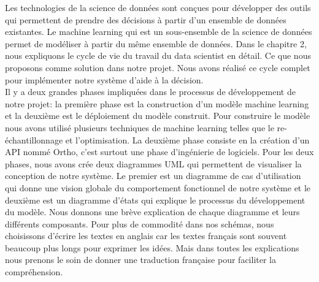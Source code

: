 \documentclass[12pt, french]{report}
\begin{document}
Les technologies de la science de données sont conçues pour développer des outils qui permettent de prendre des décisions à partir d'un ensemble de données existantes. Le machine learning qui est un sous-ensemble de la science de données permet de modéliser à partir du même ensemble de données. Dans le chapitre 2, nous expliquons le cycle de vie du travail du data scientist en détail. Ce que nous proposons comme solution dans notre projet. Nous avons réalisé ce cycle complet pour implémenter notre système d'aide à la décision. \\

Il y a deux grandes phases impliquées dans le processus de développement de notre projet: la première phase est la construction d'un modèle machine learning et la deuxième est le déploiement du modèle construit. Pour construire le modèle nous avons utilisé plusieurs techniques de machine learning telles que le re-échantillonnage et l'optimisation.  La deuxième phase consiste en la création d'un API nommé Ortho, c'est surtout une phase d'ingénierie de logiciels. Pour les deux phases, nous avons crée deux diagrammes UML qui permettent de visualiser la conception de notre système. Le premier est un diagramme de cas d'utilisation qui donne une vision globale du comportement fonctionnel de notre système et le deuxième est un diagramme d'états qui explique le processus du développement du modèle. Nous donnons une brève explication de chaque diagramme et leurs différents composants. Pour plus de commodité dans nos schémas, nous choisissons d'écrire les textes en anglais car les textes français sont souvent beaucoup plus longs pour exprimer les idées. Mais dans toutes les explications nous prenons le soin de donner une traduction française pour faciliter la compréhension.\\
\end{document}
